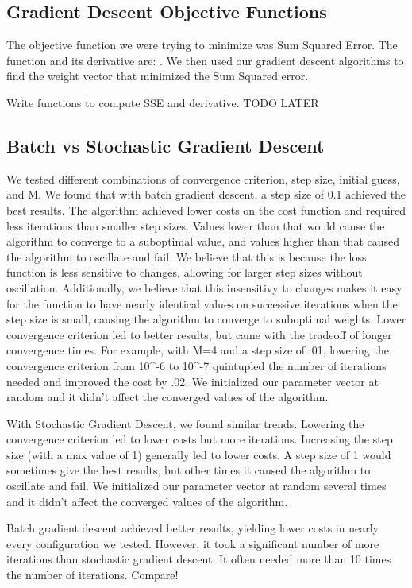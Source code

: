 \documentclass[a4paper,twoside]{article}
\begin{document}
\subsection{Gradient Descent Objective Functions}

The objective function we were trying to minimize was Sum Squared Error. The function and its derivative are: . We then used our gradient descent algorithms to find the weight vector that minimized the Sum Squared error. 

Write functions to compute SSE and derivative. TODO LATER

\subsection{Batch vs Stochastic Gradient Descent}

We tested different combinations of convergence criterion, step size, initial guess, and M. We found that with batch gradient descent, a step size of 0.1 achieved the best results. The algorithm achieved lower costs on the cost function and required less iterations than smaller step sizes. Values lower than that would cause the algorithm to converge to a suboptimal value, and values higher than that caused the algorithm to oscillate and fail. We believe that this is because the loss function is less sensitive to changes, allowing for larger step sizes without oscillation. Additionally, we believe that this insensitivy to changes makes it easy for the function to have nearly identical values on successive iterations when the step size is small, causing the algorithm to converge to suboptimal weights. Lower convergence criterion led to better results, but came with the tradeoff of longer convergence times. For example, with M=4 and a step size of .01, lowering the convergence criterion from 10^-6 to 10^-7 quintupled the number of iterations needed and improved the cost by .02. We initialized our parameter vector at random and it didn't affect the converged values of the algorithm. 

With Stochastic Gradient Descent, we found similar trends. Lowering the convergence criterion led to lower costs but more iterations. Increasing the step size (with a max value of 1) generally led to lower costs. A step size of 1 would sometimes give the best results, but other times it caused the algorithm to oscillate and fail. We initialized our parameter vector at random several times and it didn't affect the converged values of the algorithm. 

Batch gradient descent achieved better results, yielding lower costs in nearly every configuration we tested. However, it took a significant number of more iterations than stochastic gradient descent. It often needed more than 10 times the number of iterations. 
Compare!
\end{document}

